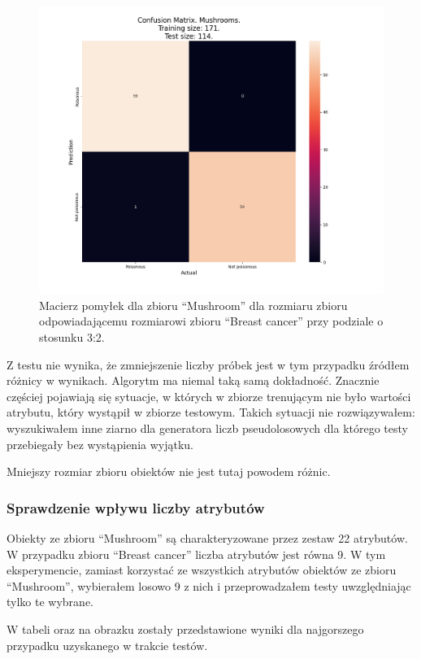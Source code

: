 \clearpage
\begin{figure}[ht!]
	\centering
		\includegraphics[width=0.7\linewidth]{photos/mush_train_size_test_size.png}
        \caption{Macierz pomyłek dla zbioru ``Mushroom'' dla rozmiaru zbioru odpowiadającemu rozmiarowi zbioru ``Breast cancer'' przy podziale o stosunku 3:2.}
\end{figure}


Z testu nie wynika, że zmniejszenie liczby próbek jest w tym przypadku źródłem
różnicy w wynikach. Algorytm ma niemal taką samą dokładność. Znacznie częściej
pojawiają się sytuacje, w których w zbiorze trenującym nie było wartości
atrybutu, który wystąpił w zbiorze testowym. Takich sytuacji nie rozwiązywałem:
wyszukiwałem inne ziarno dla generatora liczb pseudolosowych dla którego testy
przebiegały bez wystąpienia wyjątku.

Mniejszy rozmiar zbioru obiektów nie jest tutaj powodem różnic.

\subsubsection{Sprawdzenie wpływu liczby atrybutów}
Obiekty ze zbioru ``Mushroom'' są charakteryzowane przez zestaw 22 atrybutów. W
przypadku zbioru ``Breast cancer'' liczba atrybutów jest równa 9. W tym
eksperymencie, zamiast korzystać ze wszystkich atrybutów obiektów ze zbioru
``Mushroom'', wybierałem losowo 9 z nich i przeprowadzałem testy uwzględniając
tylko te wybrane.

W tabeli oraz na obrazku zostały przedstawione wyniki dla najgorszego przypadku
uzyskanego w trakcie testów.

